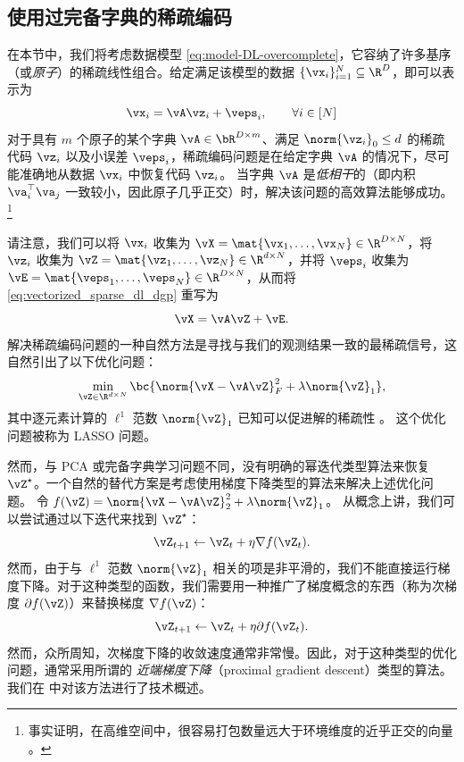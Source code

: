 \documentclass[../../book-main_zh.tex]{subfiles}
\begin{document}
\subsection{使用过完备字典的稀疏编码}

在本节中，我们将考虑数据模型
\eqref{eq:model-DL-overcomplete}，它容纳了许多基序（或\textit{原子}）的稀疏线性组合。给定满足该模型的数据
\(\{\vx_{i}\}_{i =
    1}^{N} \subseteq
\R^{D}\)，即可以表示为
\begin{equation}\label{eq:vectorized_sparse_dl_dgp}
    \vx_{i} = \vA\vz_{i} + \veps_{i}, \qquad \forall i \in [N]
\end{equation}
对于具有 $m$ 个原子的某个字典 $\vA \in \bR^{D \times m}$、满足 $\norm{\vz_i}_0 \leq
d$ 的稀疏代码 $\vz_i$ 以及小误差 $\veps_i$，稀疏编码问题是在给定字典 $\vA$ 的情况下，尽可能准确地从数据
$\vx_i$ 中恢复代码 $\vz_i$。
当字典 \(\vA\) 是\textit{低相干}的（即内积 \(\va_{i}^{\top}\va_{j}\)
一致较小，因此原子几乎正交）时，解决该问题的高效算法能够成功。\footnote{事实证明，在高维空间中，很容易打包数量远大于环境维度的近乎正交的向量
\cite{Wright-Ma-2022}。 }

请注意，我们可以将 \(\vx_{i}\) 收集为 \(\vX = \mat{\vx_{1},
\dots, \vx_{N}} \in \R^{D \times N}\)，将 \(\vz_{i}\) 收集为 \(\vZ =
\mat{\vz_{1}, \dots, \vz_{N}} \in \R^{d  \times N}\)，并将 \(\veps_{i}\)
收集为 \(\vE = \mat{\veps_{1}, \dots,
\veps_{N}} \in \R^{D \times N}\)，从而将 \eqref{eq:vectorized_sparse_dl_dgp} 重写为
\begin{equation}\label{eq:sparse_dl_dgp}
    \vX = \vA\vZ + \vE.
\end{equation}
解决稀疏编码问题的一种自然方法是寻找与我们的观测结果一致的最稀疏信号，这自然引出了以下优化问题：
\begin{equation}\label{eq:sparse_dl_lasso}
    \min_{\vZ \in \R^{d \times N}}\bc{\norm{\vX - \vA\vZ}_{F}^{2} +
    \lambda \norm{\vZ}_{1}},
\end{equation}
其中逐元素计算的 \(\ell^1\) 范数 \(\norm{\vZ}_{1}\) 已知可以促进解的稀疏性 \cite{Wright-Ma-2022}。
这个优化问题被称为 LASSO 问题。

然而，与 PCA 或完备字典学习问题不同，没有明确的幂迭代类型算法来恢复
\(\vZ^{\star}\)。一个自然的替代方案是考虑使用梯度下降类型的算法来解决上述优化问题。
令 \(f(\vZ) = \norm{\vX - \vA\vZ}_{2}^{2} + \lambda \norm{\vZ}_{1}\)。
从概念上讲，我们可以尝试通过以下迭代来找到 \(\vZ^{\star}\)：
\begin{equation}
    \vZ_{t+1} \leftarrow \vZ_t + \eta \nabla f(\vZ_t).
\end{equation}
然而，由于与 \(\ell^1\) 范数 \(\norm{\vZ}_{1}\)
相关的项是非平滑的，我们不能直接运行梯度下降。对于这种类型的函数，我们需要用一种推广了梯度概念的东西（称为次梯度 \(\partial
f(\vZ)\)）来替换梯度 \(\nabla f(\vZ)\)：
\begin{equation}
    \vZ_{t+1} \leftarrow \vZ_t + \eta \partial f(\vZ_t).
\end{equation}
然而，众所周知，次梯度下降的收敛速度通常非常慢。因此，对于这种类型的优化问题，通常采用所谓的 {\em 近端梯度下降}（proximal
gradient descent）类型的算法。我们在  中对该方法进行了技术概述。
\end{document}
